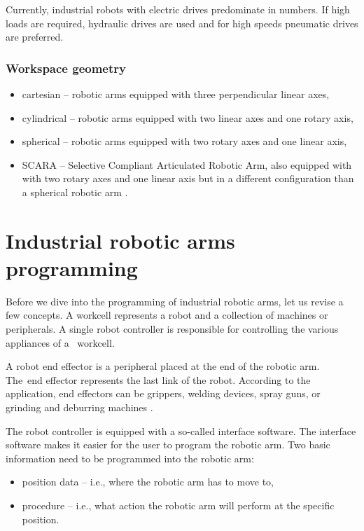 Currently, industrial robots with electric drives predominate in numbers. If high loads are required, hydraulic drives are used and for high speeds pneumatic drives are preferred.

\subsubsection*{Workspace geometry}

\begin{itemize}
    \item cartesian -- robotic arms equipped with three perpendicular linear axes,
    \item cylindrical -- robotic arms equipped with two linear axes and one rotary axis,
    \item spherical --  robotic arms equipped with two rotary axes and one linear axis,
    \item SCARA -- Selective Compliant Articulated Robotic Arm, also equipped with with two rotary axes and one linear axis but in a different configuration than a spherical robotic arm \cite{vsb_2007}.
\end{itemize}

\section{Industrial robotic arms programming}

Before we dive into the programming of industrial robotic arms, let us revise a few concepts.
A workcell represents a robot and a collection of machines or peripherals. A single robot controller is responsible for controlling the various appliances of a~ workcell.

A robot end effector is a peripheral placed at the end of the robotic arm. The~end effector represents the last link of the robot. According to the application, end effectors can be grippers, welding devices, spray guns, or grinding and deburring machines \cite{monkman_2007}.

The robot controller is equipped with a so-called interface software. The interface software makes it easier for the user to program the robotic arm.  
Two basic information need to be programmed into the robotic arm:

\begin{itemize}
    \item position data -- i.e., where the robotic arm has to move to,
    \item procedure -- i.e., what action the robotic arm will perform at the specific position.
\end{itemize}


